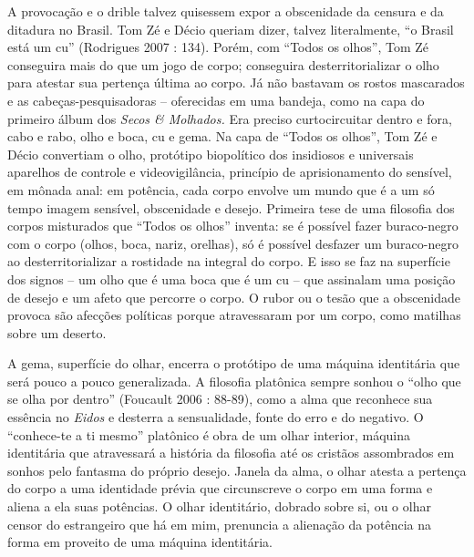 A provocação e o drible talvez quisessem expor a obscenidade da censura
e da ditadura no Brasil. Tom Zé e Décio queriam dizer, talvez
literalmente, ``o Brasil está um cu'' (Rodrigues 2007 : 134). Porém, com
``Todos os olhos'', Tom Zé conseguira mais do que um jogo de
corpo; conseguira desterritorializar o olho para atestar sua pertença
última ao corpo. Já não bastavam os rostos mascarados e as
cabeças-pesquisadoras -- oferecidas em uma bandeja, como na capa do
primeiro álbum dos \emph{Secos \& Molhados.} Era preciso curtocircuitar
dentro e fora, cabo e rabo, olho e boca, cu e gema. Na capa de ``Todos
os olhos'', Tom Zé e Décio convertiam o olho, protótipo biopolítico dos
insidiosos e universais aparelhos de controle e videovigilância,
princípio de aprisionamento do sensível, em mônada anal: em potência,
cada corpo envolve um mundo que é a um só tempo imagem sensível,
obscenidade e desejo. Primeira tese de uma filosofia dos corpos
misturados que ``Todos os olhos'' inventa: se é possível fazer
buraco-negro com o corpo (olhos, boca, nariz, orelhas), só é possível
desfazer um buraco-negro ao desterritorializar a rostidade na integral
do corpo. E isso se faz na superfície dos signos -- um olho que é uma
boca que é um cu -- que assinalam uma posição de desejo e um afeto que
percorre o corpo. O rubor ou o tesão que a obscenidade provoca são
afecções políticas porque atravessaram por um corpo, como matilhas sobre
um deserto.

A gema, superfície do olhar, encerra o protótipo de uma máquina
identitária que será pouco a pouco generalizada. A filosofia platônica
sempre sonhou o ``olho que se olha por dentro'' (Foucault 2006 : 88-89),
como a alma que reconhece sua essência no \emph{Eidos} e desterra a
sensualidade, fonte do erro e do negativo. O ``conhece-te a ti mesmo''
platônico é obra de um olhar interior, máquina identitária que
atravessará a história da filosofia até os cristãos assombrados em
sonhos pelo fantasma do próprio desejo. Janela da alma, o olhar atesta a
pertença do corpo a uma identidade prévia que circunscreve o corpo em
uma forma e aliena a ela suas potências. O olhar identitário, dobrado
sobre si, ou o olhar censor do estrangeiro que há em mim, prenuncia a
alienação da potência na forma em proveito de uma máquina identitária.

